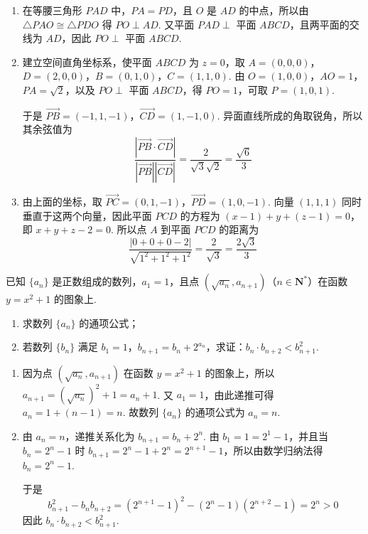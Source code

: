 \begin{solution}
\begin{enumerate}
\item 在等腰三角形 \(PAD\) 中，\(PA=PD\)，且 \(O\) 是 \(AD\) 的中点，所以由 \(\triangle PAO\cong\triangle PDO\) 得 \(PO\perp AD\). 又平面 \(PAD\perp\) 平面 \(ABCD\)，且两平面的交线为 \(AD\)，因此 \(PO\perp\) 平面 \(ABCD\).
\item 建立空间直角坐标系，使平面 \(ABCD\) 为 \(z=0\)，取
\(A=(0,0,0)\)，\(D=(2,0,0)\)，\(B=(0,1,0)\)，\(C=(1,1,0)\).
由 \(O=(1,0,0)\)，\(AO=1\)，\(PA=\sqrt{2}\)，以及 \(PO\perp\) 平面 \(ABCD\)，得 \(PO=1\)，可取 \(P=(1,0,1)\).

于是 \(\overrightarrow{PB}=(-1,1,-1)\)，\(\overrightarrow{CD}=(1,-1,0)\).
异面直线所成的角取锐角，所以其余弦值为
\[
\frac{\left|\overrightarrow{PB}\cdot\overrightarrow{CD}\right|}{\left|\overrightarrow{PB}\right|\left|\overrightarrow{CD}\right|}
=\frac{2}{\sqrt{3}\sqrt{2}}=\frac{\sqrt{6}}{3}
\]
\item 由上面的坐标，取
\(\overrightarrow{PC}=(0,1,-1)\)，\(\overrightarrow{PD}=(1,0,-1)\).
向量 \((1,1,1)\) 同时垂直于这两个向量，因此平面 \(PCD\) 的方程为
\((x-1)+y+(z-1)=0\)，即 \(x+y+z-2=0\).
所以点 \(A\) 到平面 \(PCD\) 的距离为
\[
\frac{\left|0+0+0-2\right|}{\sqrt{1^2+1^2+1^2}}=\frac{2}{\sqrt{3}}=\frac{2\sqrt{3}}{3}
\]
\end{enumerate}
\end{solution}

\begin{problem}
已知 \(\{a_{n}\}\) 是正数组成的数列，\(a_{1} = 1\)，且点 \((\sqrt{a_{n}}, a_{n+1})\)（\(n \in \mathbf{N}^{*}\)）在函数 \(y = x^{2} + 1\) 的图象上.

\begin{enumerate}
\item 求数列 \(\{a_{n}\}\) 的通项公式；
\item 若数列 \(\{b_{n}\}\) 满足 \(b_{1}=1\)，\(b_{n+1}=b_{n}+2^{a_{n}}\)，求证：\(b_{n}\cdot b_{n+2}<b_{n+1}^{2}\).
\end{enumerate}
\end{problem}

\begin{solution}
\begin{enumerate}
\item 因为点 \(\left(\sqrt{a_n},a_{n+1}\right)\) 在函数 \(y=x^2+1\) 的图象上，所以
\(a_{n+1}=\left(\sqrt{a_n}\right)^2+1=a_n+1\). 又 \(a_1=1\)，由此递推可得 \(a_n=1+(n-1)=n\). 故数列 \(\{a_n\}\) 的通项公式为 \(a_n=n\).
\item 由 \(a_n=n\)，递推关系化为
\(b_{n+1}=b_n+2^n\). 由 \(b_1=1=2^1-1\)，并且当 \(b_n=2^n-1\) 时 \(b_{n+1}=2^n-1+2^n=2^{n+1}-1\)，所以由数学归纳法得 \(b_n=2^n-1\).

于是
\[
b_{n+1}^2-b_nb_{n+2}=\left(2^{n+1}-1\right)^2-\left(2^n-1\right)\left(2^{n+2}-1\right)=2^n>0
\]
因此 \(b_n\cdot b_{n+2}<b_{n+1}^2\).
\end{enumerate}
\end{solution}

